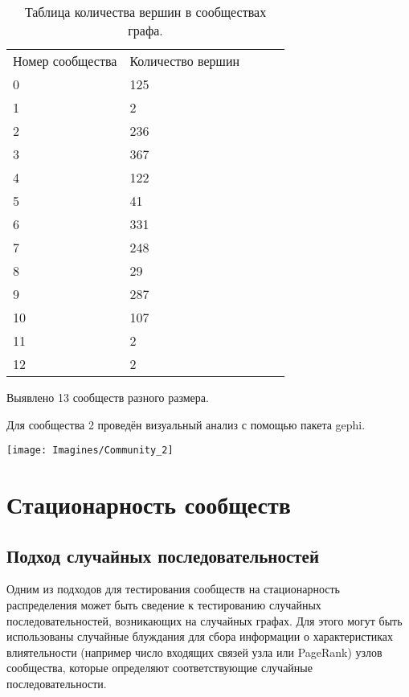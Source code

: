\documentclass[a4paper,12pt]{article}
\begin{document}
\begin{table}[h!]
\begin{tabular}{|l|l|lll}
\cline{1-2}
Номер сообщества & Количество вершин &  &  &  \\ \cline{1-2}
0                & 125               &  &  &  \\ \cline{1-2}
1                & 2                 &  &  &  \\ \cline{1-2}
2                & 236               &  &  &  \\ \cline{1-2}
3                & 367               &  &  &  \\ \cline{1-2}
4                & 122               &  &  &  \\ \cline{1-2}
5                & 41                &  &  &  \\ \cline{1-2}
6                & 331               &  &  &  \\ \cline{1-2}
7                & 248               &  &  &  \\ \cline{1-2}
8                & 29                &  &  &  \\ \cline{1-2}
9                & 287               &  &  &  \\ \cline{1-2}
10               & 107               &  &  &  \\ \cline{1-2}
11               & 2                 &  &  &  \\ \cline{1-2}
12               & 2                 &  &  &  \\ \cline{1-2}

\end{tabular}
\caption {Таблица количества вершин в сообществах графа.}
\end{table}
Выявлено 13 сообществ разного размера.


Для сообщества 2 проведён визуальный анализ с помощью пакета  gephi.

\begin{center}
\centering 
\texttt{[image: Imagines/Community\_2]}
\end{center}



\section{Стационарность сообществ}
\subsection{Подход случайных последовательностей}
	Одним из подходов для тестирования сообществ на стационарность распределения может быть сведение к тестированию случайных последовательностей, возникающих на случайных графах. Для этого могут быть использованы случайные блуждания для сбора информации о характеристиках влиятельности (например число входящих связей узла или PageRank) узлов сообщества, которые определяют соответствующие случайные последовательности.
	
\end{document}
